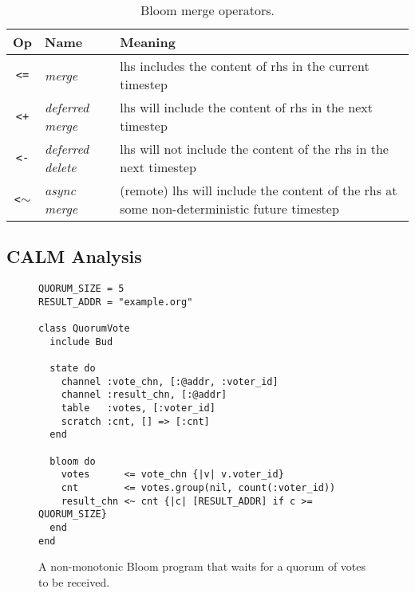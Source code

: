 \begin{table}
\begin{tabular}{|c|l|p{1.85in}|}
\hline
\textbf{Op} & \textbf{Name} & \textbf{Meaning} \\
\hline
\verb|<=| & \emph{merge} & lhs includes the content of rhs in the
current timestep \\
\hline
\verb|<+| & \emph{deferred merge} & lhs will include the content of rhs in the
next timestep \\
\hline
\verb|<-| & \emph{deferred delete} & lhs will not include the content of the rhs
in the next timestep \\
\hline
\verb|<|$\sim$ & \emph{async merge} & (remote) lhs will include the content of the
rhs at some non-deterministic future timestep\\
\hline
\end{tabular}
\caption{Bloom merge operators.}
\label{tbl:bloom-ops}
\end{table}

\subsection{CALM Analysis}
\label{sec:bg-calm}


\begin{figure}[t]
\begin{scriptsize}
\begin{lstlisting}
QUORUM_SIZE = 5
RESULT_ADDR = "example.org"

class QuorumVote
  include Bud

  state do
    channel :vote_chn, [:@addr, :voter_id]
    channel :result_chn, [:@addr]
    table   :votes, [:voter_id]
    scratch :cnt, [] => [:cnt]
  end

  bloom do
    votes      <= vote_chn {|v| v.voter_id}
    cnt        <= votes.group(nil, count(:voter_id))
    result_chn <~ cnt {|c| [RESULT_ADDR] if c >= QUORUM_SIZE}
  end
end
\end{lstlisting}
\end{scriptsize}
\caption{A non-monotonic Bloom program that waits for a quorum of votes to be received.}
\label{fig:bloom-nm-quorum}
\end{figure}
